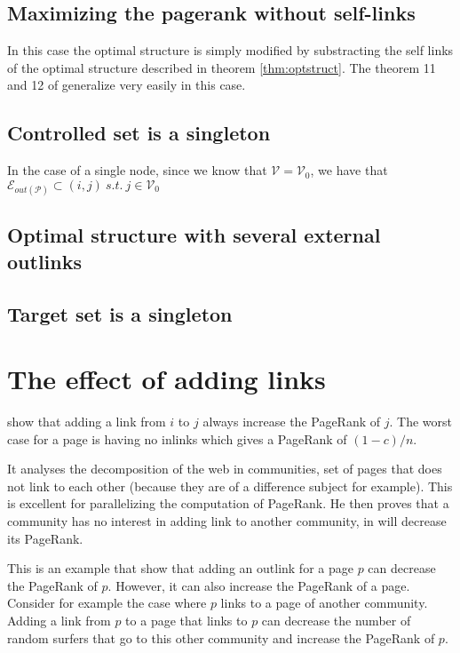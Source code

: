 \documentclass{article}
\newcommand{\1}{\mathbf{1}}
\theoremstyle{definition}
\begin{document}
\subsection{Maximizing the pagerank without self-links}
In this case the optimal structure is simply modified by substracting the self links of the optimal structure described in theorem \ref{thm:optstruct}. The theorem 11 and 12 of \cite{de2008maximizing} generalize very easily in this case.
\subsection{Controlled set is a singleton}
In the case of a single node, since we know that $\mathcal{V} = \mathcal{V}_0$, we have that $\mathcal{E}_{out(\mathcal{P})} \subset (i,j) \: s.t. \: j \in \mathcal{V}_0$
\subsection{Optimal structure with several external outlinks}


\subsection{Target set is a singleton}


\section{The effect of adding links}
\cite{avrachenkov2004decomposition} show that adding a link
from $i$ to $j$ always increase the PageRank of $j$.
The worst case for a page is having no inlinks which gives a PageRank of $(1-c)/n$.

It analyses the decomposition of the web in communities,
set of pages that does not link to each other (because they are of a difference subject for example).
This is excellent for parallelizing the computation of PageRank.
He then proves that a community has no interest in adding link to another community,
in will decrease its PageRank.

This is an example that show that adding an outlink for a page $p$ can decrease the PageRank of $p$.
However, it can also increase the PageRank of a page.
Consider for example the case where $p$ links to a page of another community.
Adding a link from $p$ to a page that links to $p$ can decrease the number of random surfers that go to this other community and increase the PageRank of $p$.
\end{document}
